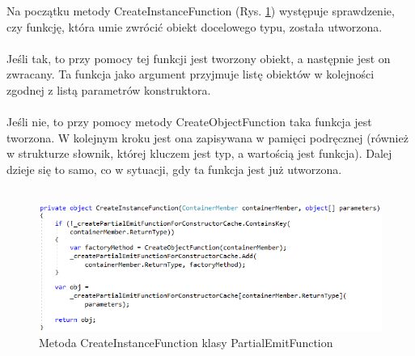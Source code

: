 \documentclass[12pt]{article}
\begin{document}
Na początku metody CreateInstanceFunction (Rys. \ref{fig:PartialEmitFunction_CreateInstanceFunction}) występuje sprawdzenie, czy funkcję, która umie zwrócić obiekt docelowego typu, została utworzona.\\
\\
Jeśli tak, to przy pomocy tej funkcji jest tworzony obiekt, a następnie jest on zwracany. Ta funkcja jako argument przyjmuje listę obiektów w kolejności zgodnej z listą parametrów konstruktora.\\
\\
Jeśli nie, to przy pomocy metody CreateObjectFunction taka funkcja jest tworzona. W kolejnym kroku jest ona zapisywana w pamięci podręcznej (również w strukturze słownik, której kluczem jest typ, a wartością jest funkcja). Dalej dzieje się to samo, co w sytuacji, gdy ta funkcja jest już utworzona.\\ \\
\begin{figure}[H]
	\begin{center}
  		\includegraphics{PartialEmitFunction_CreateInstanceFunction.png}
  		\caption{Metoda CreateInstanceFunction klasy PartialEmitFunction}
  		\label{fig:PartialEmitFunction_CreateInstanceFunction}
	\end{center}
\end{figure}
\end{document}
